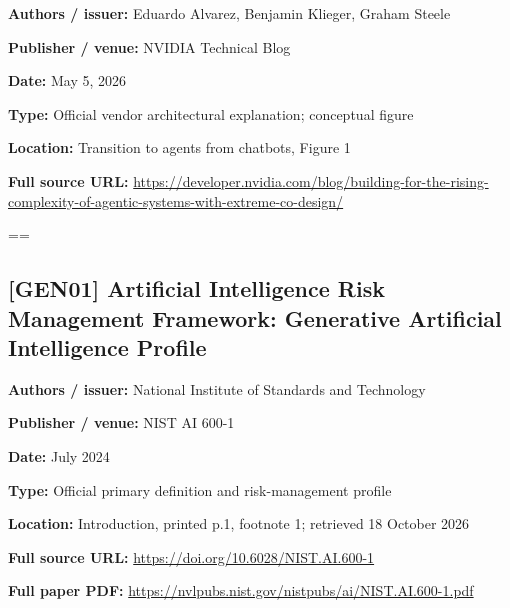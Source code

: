 \documentclass[10pt,letterpaper]{article}
\begin{document}
\textbf{Authors / issuer:} Eduardo Alvarez, Benjamin Klieger, Graham Steele\par
\textbf{Publisher / venue:} NVIDIA Technical Blog\par
\textbf{Date:} May 5, 2026\par
\textbf{Type:} Official vendor architectural explanation; conceptual figure\par
\textbf{Location:} Transition to agents from chatbots, Figure 1\par
\textbf{Full source URL:} \href{https://developer.nvidia.com/blog/building-for-the-rising-complexity-of-agentic-systems-with-extreme-co-design/}{\small\ttfamily https:/\allowbreak{}/\allowbreak{}developer.\allowbreak{}nvidia.\allowbreak{}com/\allowbreak{}blog/\allowbreak{}building-\allowbreak{}for-\allowbreak{}the-\allowbreak{}rising-\allowbreak{}complexity-\allowbreak{}of-\allowbreak{}agentic-\allowbreak{}systems-\allowbreak{}with-\allowbreak{}extreme-\allowbreak{}co-\allowbreak{}design/\allowbreak{}}\par
\egroup\par\noindent\box\readingEntry\par\medskip
\setbox\readingEntry=\vbox\bgroup\hsize=\linewidth\subsection*{[GEN01] Artificial Intelligence Risk Management Framework: Generative Artificial Intelligence Profile}
\textbf{Authors / issuer:} National Institute of Standards and Technology\par
\textbf{Publisher / venue:} NIST AI 600-1\par
\textbf{Date:} July 2024\par
\textbf{Type:} Official primary definition and risk-management profile\par
\textbf{Location:} Introduction, printed p.1, footnote 1; retrieved 18 October 2026\par
\textbf{Full source URL:} \href{https://doi.org/10.6028/NIST.AI.600-1}{\small\ttfamily https:/\allowbreak{}/\allowbreak{}doi.\allowbreak{}org/\allowbreak{}10.\allowbreak{}6028/\allowbreak{}NIST.\allowbreak{}AI.\allowbreak{}600-\allowbreak{}1}\par
\textbf{Full paper PDF:} \href{https://nvlpubs.nist.gov/nistpubs/ai/NIST.AI.600-1.pdf}{\small\ttfamily https:/\allowbreak{}/\allowbreak{}nvlpubs.\allowbreak{}nist.\allowbreak{}gov/\allowbreak{}nistpubs/\allowbreak{}ai/\allowbreak{}NIST.\allowbreak{}AI.\allowbreak{}600-\allowbreak{}1.\allowbreak{}pdf}\par
\end{document}
